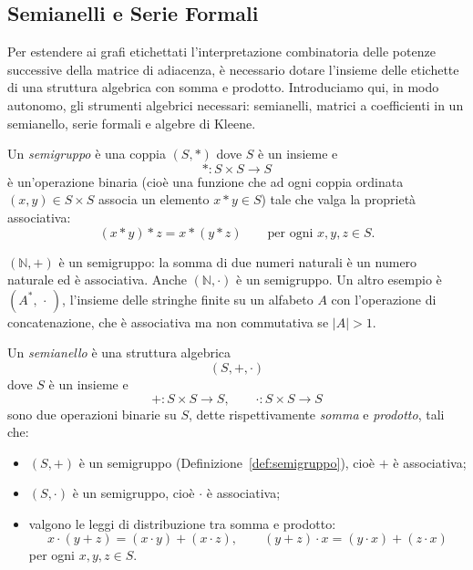 \subsection{Semianelli e Serie Formali}
\label{sec:semianelli-serie-formali}

Per estendere ai grafi etichettati l'interpretazione combinatoria delle potenze successive della matrice di adiacenza, è necessario dotare l'insieme delle etichette di una struttura algebrica con somma e prodotto. Introduciamo qui, in modo autonomo, gli strumenti algebrici necessari: semianelli, matrici a coefficienti in un semianello, serie formali e algebre di Kleene.

\begin{defi}[Semigruppo]\label{def:semigruppo}
Un \emph{semigruppo} è una coppia $(S,\ast)$ dove $S$ è un insieme e
\[\ast: S\times S \to S\]
è un'operazione binaria (cioè una funzione che ad ogni coppia ordinata $(x,y)\in S\times S$ associa un elemento $x\ast y\in S$) tale che valga la proprietà associativa:
\[(x\ast y)\ast z = x\ast(y\ast z) \qquad \text{per ogni } x,y,z\in S.\]
\end{defi}

\begin{exam}
$(\mathbb{N},+)$ è un semigruppo: la somma di due numeri naturali è un numero naturale ed è associativa. Anche $(\mathbb{N},\cdot)$ è un semigruppo. Un altro esempio è $(A^*,\,\cdot\,)$, l'insieme delle stringhe finite su un alfabeto $A$ con l'operazione di concatenazione, che è associativa ma non commutativa se $\vert{}A\vert{}>1$.
\end{exam}

\begin{defi}[Semianello]\label{def:semianello}
Un \emph{semianello} è una struttura algebrica
\[(S,+,\cdot)\]
dove $S$ è un insieme e
\[+: S\times S \to S, \qquad \cdot: S\times S \to S\]
sono due operazioni binarie su $S$, dette rispettivamente \emph{somma} e \emph{prodotto}, tali che:
\begin{itemize}
    \item $(S,+)$ è un semigruppo (Definizione~\ref{def:semigruppo}), cioè $+$ è associativa;
    \item $(S,\cdot)$ è un semigruppo, cioè $\cdot$ è associativa;
    \item valgono le leggi di distribuzione tra somma e prodotto:
    \[x\cdot(y+z) = (x\cdot y) + (x\cdot z), \qquad (y+z)\cdot x = (y\cdot x) + (z\cdot x)\]
    per ogni $x,y,z\in S$.
\end{itemize}
\end{defi}

